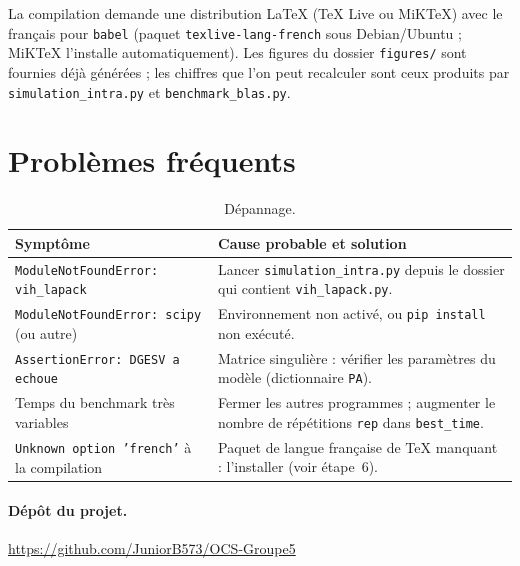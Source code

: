 \documentclass[11pt,a4paper]{report}
\theoremstyle{plain}
\theoremstyle{definition}
\theoremstyle{remark}
\begin{document}
\noindent La compilation demande une distribution \LaTeX{} (TeX Live ou MiKTeX) avec le français pour \texttt{babel} (paquet \texttt{texlive-lang-french} sous Debian/Ubuntu ; MiKTeX l'installe automatiquement). Les figures du dossier \texttt{figures/} sont fournies déjà générées ; les chiffres que l'on peut recalculer sont ceux produits par \texttt{simulation\_intra.py} et \texttt{benchmark\_blas.py}.

\section{Problèmes fréquents}

\begin{table}[ht]
\centering
\caption{Dépannage.}
\begin{tabularx}{\textwidth}{p{5.2cm} X}
\toprule
\textbf{Symptôme} & \textbf{Cause probable et solution} \\
\midrule
\texttt{ModuleNotFoundError: vih\_lapack} & Lancer \texttt{simulation\_intra.py} depuis le dossier qui contient \texttt{vih\_lapack.py}. \\
\texttt{ModuleNotFoundError: scipy} (ou autre) & Environnement non activé, ou \texttt{pip install} non exécuté. \\
\texttt{AssertionError: DGESV a echoue} & Matrice singulière : vérifier les paramètres du modèle (dictionnaire \texttt{PA}). \\
Temps du benchmark très variables & Fermer les autres programmes ; augmenter le nombre de répétitions \texttt{rep} dans \texttt{best\_time}. \\
\texttt{Unknown option 'french'} à la compilation & Paquet de langue française de \TeX{} manquant : l'installer (voir étape~6). \\
\bottomrule
\end{tabularx}
\end{table}

\paragraph{Dépôt du projet.} \url{https://github.com/JuniorB573/OCS-Groupe5}
\end{document}
